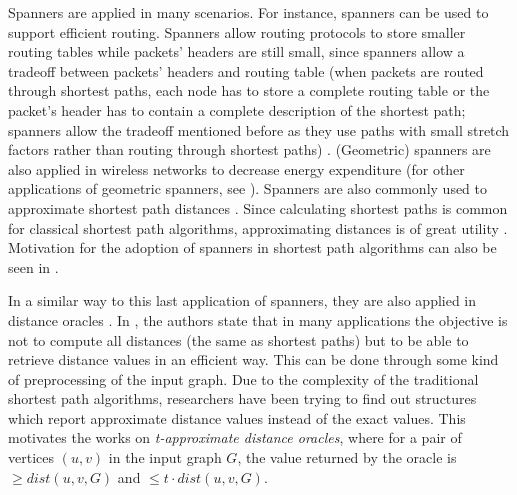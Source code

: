Spanners are applied in many scenarios. For instance, spanners can be used to support efficient routing. Spanners 
allow routing protocols to store smaller routing tables while packets' headers are still small, 
since spanners allow a tradeoff between packets' headers and routing table 
(when packets are routed through shortest paths, each node has to store a complete routing table or the packet's header has to contain a complete description of the 
shortest path; spanners allow the tradeoff mentioned before as they use paths with small stretch factors rather than routing through shortest paths) 
\cite{Thorup2001}. (Geometric) spanners are also 
applied in wireless networks to decrease energy expenditure \cite{Schindelhauer2007} (for other applications of geometric spanners, see \cite{Narasimhan2007}). 
Spanners are also commonly used to approximate 
shortest path distances \cite{Feigenbaum2008}. Since calculating shortest paths is common for classical shortest path algorithms, 
approximating distances is of great utility \cite{Feigenbaum2008}. 
Motivation for the adoption of spanners in shortest path algorithms can also be seen in \cite{Elkin2001}.

In a similar way to this last application of spanners, they are also 
applied in distance oracles \cite{Baswana2006,Thorup2005}. In \cite{Baswana2006}, the authors state that in many applications the objective is 
not to compute all distances (the same as shortest paths) but to be able to retrieve distance values in an efficient way. This can be done through some kind 
of preprocessing of the input graph. Due to the complexity of the traditional shortest path algorithms, researchers have been trying to find out structures 
which report approximate distance values instead of the exact values. This motivates the works on \emph{t-approximate distance oracles}, where for 
a pair of vertices $(u,v)$ in the input graph $G$, the value returned by the oracle is $\ge dist(u,v,G)$ and $\le t \cdot dist(u,v,G)$.

